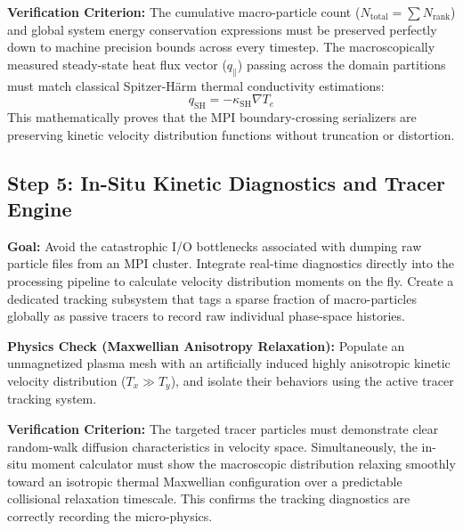 \documentclass[11pt,a4paper]{article}
\begin{document}
\medskip
\noindent\textbf{Verification Criterion:} The cumulative macro-particle count (\(N_{\text{total}} = \sum N_{\text{rank}}\)) and global system energy conservation expressions must be preserved perfectly down to machine precision bounds across every timestep. The macroscopically measured steady-state heat flux vector (\(q_\parallel\)) passing across the domain partitions must match classical Spitzer-Härm thermal conductivity estimations:
\begin{equation}
q_{\text{SH}} = -\kappa_{\text{SH}} \nabla T_e
\end{equation}
This mathematically proves that the MPI boundary-crossing serializers are preserving kinetic velocity distribution functions without truncation or distortion.

\subsection{Step 5: In-Situ Kinetic Diagnostics and Tracer Engine}
\textbf{Goal:} Avoid the catastrophic I/O bottlenecks associated with dumping raw particle files from an MPI cluster. Integrate real-time diagnostics directly into the processing pipeline to calculate velocity distribution moments on the fly. Create a dedicated tracking subsystem that tags a sparse fraction of macro-particles globally as passive tracers to record raw individual phase-space histories.

\medskip
\noindent\textbf{Physics Check (Maxwellian Anisotropy Relaxation):} Populate an unmagnetized plasma mesh with an artificially induced highly anisotropic kinetic velocity distribution (\(T_x \gg T_y\)), and isolate their behaviors using the active tracer tracking system.

\medskip
\noindent\textbf{Verification Criterion:} The targeted tracer particles must demonstrate clear random-walk diffusion characteristics in velocity space. Simultaneously, the in-situ moment calculator must show the macroscopic distribution relaxing smoothly toward an isotropic thermal Maxwellian configuration over a predictable collisional relaxation timescale. This confirms the tracking diagnostics are correctly recording the micro-physics.
\end{document}
